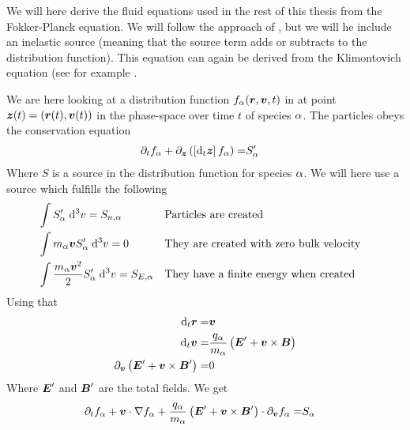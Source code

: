 We will here derive the fluid equations used in the rest of this thesis from
the Fokker-Planck equation. We will follow the approach of
\cite{Helander2002book}, but we will he include an inelastic source (meaning
that the source term adds or subtracts to the distribution function). This
equation can again be derived from the Klimontovich equation (see for example
\cite{Klimontovich1983book}.

We are here looking at a distribution function $f_\alpha(\boldsymbol{r},\boldsymbol{v},t)$ in at point
$\boldsymbol{z}(t)=(\boldsymbol{r}(t),\boldsymbol{v}(t))$ in the phase-space over time $t$ of species
$\alpha$. The particles obeys the conservation equation
%
\begin{align*}
    \partial_t f_\alpha + \partial_{\boldsymbol{z}} \left(\left[\text{d}_t \boldsymbol{z}\right]f_\alpha\right) =& S'_\alpha
\end{align*}
%
Where $S$ is a source in the distribution function for species $\alpha$. We
will here use a source which fulfills the following
%
\begin{align*}
    &\int {S'_{\alpha}} \; \text{d} {^3v} = S_{n,\alpha}&
    &\text{Particles are created}&
    \\
    &\int {m_\alpha\boldsymbol{v} S'_\alpha} \; \text{d} {^3v} = 0&
    &\text{They are created with zero bulk velocity}&
    \\
    &\int {\frac{m_\alpha\boldsymbol{v}^2}{2} S'_\alpha} \; \text{d} {^3v} = S_{E,\alpha}&
    &\text{They have a finite energy when created}&
\end{align*}
%
Using that
%
\begin{align*}
    \text{d}_t \boldsymbol{r}     =& \boldsymbol{v}\\
    \text{d}_t \boldsymbol{v}     =& \frac{q_\alpha}{m_\alpha}\left(\boldsymbol{E}'+\boldsymbol{v}\times\boldsymbol{B}\right)\\
    \partial_{\boldsymbol{v}} \left(\boldsymbol{E}'+\boldsymbol{v}\times\boldsymbol{B}'\right) =& 0
\end{align*}
%
Where $\boldsymbol{E}'$ and $\boldsymbol{B}'$ are the total fields. We get
%
\begin{align*}
      \partial_t f_\alpha
    + \boldsymbol{v}\cdot\nabla f_\alpha
    + \frac{q_\alpha}{m_\alpha}
      \left(\boldsymbol{E}'+\boldsymbol{v}\times\boldsymbol{B}'\right)\cdot\partial_{\boldsymbol{v}}f_\alpha
    =& S_\alpha
\end{align*}


